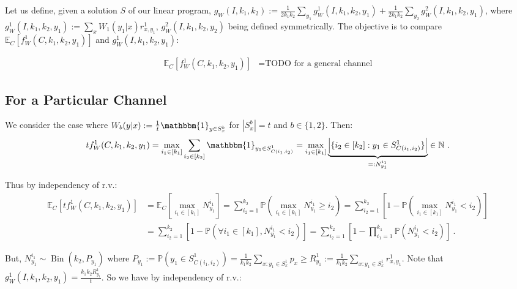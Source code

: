 \documentclass[11pt]{article}
\theoremstyle{definition}
\theoremstyle{remark}
\DeclareMathOperator{\Bin}{\text{Bin}}
\begin{document}
Let us define, given a solution $S$ of our linear program, $g_W(I,k_1,k_2):=\frac{1}{2k_1k_2}\sum_{y_1}g_W^1(I,k_1,k_2,y_1)+ \frac{1}{2k_1k_2}\sum_{y_2}g_W^2(I,k_1,k_2,y_1)$, where $g_W^1(I,k_1,k_2,y_1):=\sum_{x} W_1(y_1|x)r^1_{x,y_1}$, $g_W^2(I,k_1,k_2,y_2)$ being defined symmetrically. The objective is to compare $\mathbb{E}_C\left[f_W^1(C,k_1,k_2,y_1)\right]$ and $g_W^1(I,k_1,k_2,y_1)$:

\begin{equation}
  \begin{aligned}
    \mathbb{E}_C\left[f_W^1(C,k_1,k_2,y_1)\right] &= \text{TODO for a general channel}
  \end{aligned}
\end{equation}

\subsection{For a Particular Channel}
We consider the case where $W_b(y|x) := \frac{1}{t} \mathbbm{1}_{y \in S^b_x}$ for $|S^b_x|=t$ and $b \in \{1,2\}$. Then:
\[ tf_W^1(C,k_1,k_2,y_1) =  \max_{i_1 \in [k_1]} \sum_{i_2 \in [k_2]} \mathbbm{1}_{y_1 \in S^1_{C(i_1,i_2)}} = \max_{i_1 \in [k_1]} \underbrace{\left| \{ i_2 \in [k_2] : y_1 \in S^1_{C(i_1,i_2)} \} \right|}_{=: N^{i_1}_{y_1}} \in \mathbb{N} \ . \]

Thus by independency of r.v.:
\begin{equation}
  \begin{aligned}
    \mathbb{E}_C\left[tf_W^1(C,k_1,k_2,y_1)\right] &= \mathbb{E}_C\left[\max_{i_1 \in [k_1]} N^{i_1}_{y_1}\right] = \sum_{i_2 = 1}^{k_2}\mathbb{P}\left(\max_{i_1 \in [k_1]} N^{i_1}_{y_1} \geq i_2\right) = \sum_{i_2 = 1}^{k_2}\left[1 - \mathbb{P}\left(\max_{i_1 \in [k_1]} N^{i_1}_{y_1} < i_2\right)\right]\\
    &= \sum_{i_2 = 1}^{k_2}\left[1 - \mathbb{P}\left(\forall i_1 \in [k_1], N^{i_1}_{y_1} < i_2\right)\right] = \sum_{i_2 = 1}^{k_2}\left[1 - \prod_{i_1 = 1}^{k_1}\mathbb{P}\left(N^{i_1}_{y_1} < i_2\right)\right] \ .
  \end{aligned}
\end{equation}

But, $N^{i_1}_{y_1} \sim \Bin\left(k_2,P_{y_1}\right)$ where $P_{y_1} := \mathbb{P}\left(y_1 \in S^1_{C(i_1,i_2)}\right) = \frac{1}{k_1k_2}\sum_{x : y_1 \in S^1_x} p_x \geq R^1_{y_1} := \frac{1}{k_1k_2}\sum_{x : y_1 \in S^1_x} r^1_{x,y_1}$. Note that $g_W^1(I,k_1,k_2,y_1) = \frac{k_1k_2R^1_{y_1}}{t}$. So we have by independency of r.v.:
\end{document}
